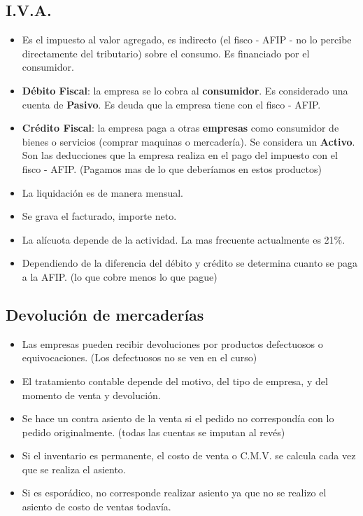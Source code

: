 \documentclass[titlepage,a4paper]{article}
\begin{document}
\subsection*{I.V.A.}
\begin{itemize}
\item Es el impuesto al valor agregado, es indirecto (el fisco - AFIP - no lo percibe directamente del tributario) sobre el consumo. Es financiado por el consumidor.
\item \textbf{Débito Fiscal}: la empresa se lo cobra al \textbf{consumidor}. Es considerado una cuenta de \textbf{Pasivo}. Es deuda que la empresa tiene con el fisco - AFIP.
\item \textbf{Crédito Fiscal}: la empresa paga a otras \textbf{empresas} como consumidor de bienes o servicios (comprar maquinas o mercadería). Se considera un \textbf{Activo}. Son las deducciones que la empresa realiza en el pago del impuesto con el fisco - AFIP. (Pagamos mas de lo que deberíamos en estos productos)
\item La liquidación es de manera mensual.
\item Se grava el facturado, importe neto.
\item La alícuota depende de la actividad. La mas frecuente actualmente es 21\%.
\item Dependiendo de la diferencia del débito y crédito se determina cuanto se paga a la AFIP. (lo que cobre menos lo que pague)
\end{itemize}



\subsection*{Devolución de mercaderías}
\begin{itemize}
\item Las empresas pueden recibir devoluciones por productos defectuosos o equivocaciones. (Los defectuosos no se ven en el curso)
\item El tratamiento contable depende del motivo, del tipo de empresa, y del momento de venta y devolución.
\item Se hace un contra asiento de la venta si el pedido no correspondía con lo pedido originalmente. (todas las cuentas se imputan al revés)
\item Si el inventario es permanente, el costo de venta o C.M.V. se calcula cada vez que se realiza el asiento.
\item Si es esporádico, no corresponde realizar asiento ya que no se realizo el asiento de costo de ventas todavía.
\end{itemize}
\end{document}
